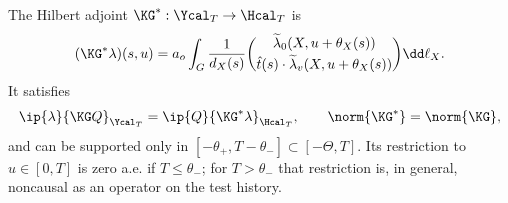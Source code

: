 \begin{proposition}\label{prop:adjoint}
The Hilbert adjoint $\KG^*:\Ycal_T\to\Hcal_T$ is
\begin{equation}\label{eq:temporaladjoint}
(\KG^*\lambda)(s,u)=a_o\int_G\frac{1}{d_X(s)}
\binom{\widetilde\lambda_0(X,u+\theta_X(s))}
{\hat t(s)\cdot\widetilde\lambda_v(X,u+\theta_X(s))}\dd\ell_X.
\end{equation}
It satisfies
\begin{equation}\label{eq:duality}
\ip{\lambda}{\KG Q}_{\Ycal_T}=\ip{Q}{\KG^*\lambda}_{\Hcal_T},
\qquad\norm{\KG^*}=\norm{\KG},
\end{equation}
and can be supported only in $[-\theta_+,T-\theta_-]\subset[-\Theta,T]$. Its restriction to $u\in[0,T]$ is zero a.e. if $T\le\theta_-$; for $T>\theta_-$ that restriction is, in general, noncausal as an operator on the test history.
\end{proposition}

